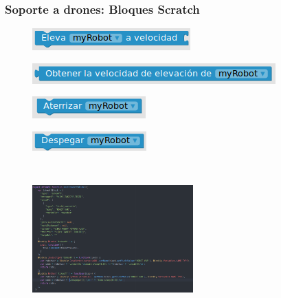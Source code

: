 \documentclass[xcolor={table}]{beamer}
\begin{document}
		\begin{frame}
		\frametitle{Soporte a drones: Bloques Scratch}
		 \begin{minipage}{.45\textwidth}
		       \begin{figure}[H]
            \centering
            \includegraphics[scale=0.5]{img/ascensionBlockly.png}
           \label{fig:ascension}
            \end{figure}
                 \begin{figure}[H]
            \centering
            \includegraphics[scale=0.4]{img/verticalBlockly.png}
           \label{fig:vertica}
            \end{figure}
            \begin{figure}[H]
            \centering
            \includegraphics[scale=0.48]{img/aterrizarBlockly.png}
           \label{fig:vertica}
            \end{figure}
               \begin{figure}[H]
            \centering
            \includegraphics[scale=0.5]{img/despegarBlockly.png}
           \label{fig:vertica}
            \end{figure}
            \end{minipage}
            \begin{minipage}{.48\textwidth}
            \begin{figure}
                \centering                   \includegraphics[width=6.2cm, height=5.8cm]{img/traduccionDespegar.png}
                \label{fig:traduccion}
            \end{figure}
            \end{minipage}
		\end{frame}
		
\end{document}

